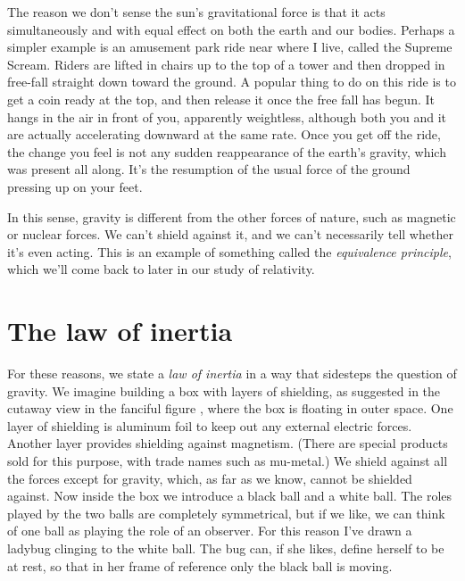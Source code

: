 The reason we don't sense the sun's gravitational force is that it acts simultaneously and with
equal effect on both the earth and our bodies. Perhaps a simpler example is an amusement park ride near
where I live, called the Supreme Scream. Riders are lifted in chairs up to the top of a tower and then
dropped in free-fall straight down toward the ground. A popular thing to do on this ride is to get a coin ready at the
top, and then release it once the free fall has begun. It  hangs in the air in front of you, apparently
weightless, although both you and it are actually accelerating downward at the same rate. Once you get
off the ride, the change you feel is not any sudden reappearance of the earth's gravity, which was present all
along. It's the resumption of the usual force of the ground pressing up on your feet.

In this sense, gravity is different from the other forces of nature, such as magnetic or nuclear forces.
We can't shield against it, and we can't necessarily tell whether it's even acting. This is an example
of something called the \emph{equivalence principle}, which we'll come back to later in our study of relativity.

\begin{figure}\label{fig:waage-box}
\end{figure}

\section{The law of inertia}

For these reasons, we state a \emph{law of inertia} in a way that sidesteps the question of gravity.
We imagine building a box with layers of shielding, as suggested in the cutaway view in the fanciful figure
,
where the box is floating in outer space.
One layer of shielding is aluminum foil to keep out any external electric forces. Another layer provides
shielding against magnetism. (There are special products sold for this purpose, with trade names such
as mu-metal.) We shield against all the forces except for gravity, which, as far as we know, cannot be
shielded against. Now inside the box we introduce a black ball and a white ball. The roles played by the
two balls are completely symmetrical, but if we like, we can think of one ball as playing the role of
an observer. For this reason I've drawn a ladybug clinging to the white ball. The bug can, if she
likes, define herself to be at rest, so that in her frame of reference only the black ball is moving.

